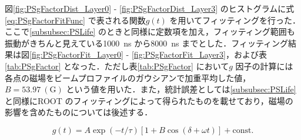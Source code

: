 図\ref{fig:PSgFactorDist_Layer0} - \ref{fig:PSgFactorDist_Layer3} のヒストグラムに式\eqref{eq:PSgFactorFitFunc} で表される関数$g(t)$ を用いてフィッティングを行った．ここで\ref{subsubsec:PSLife} のときと同様に定数項を加え，フィッティング範囲も振動がきちんと見えている1000~ns から8000~ns までとした．フィッティング結果は図\ref{fig:PSgFactorFit_Layer0} - \ref{fig:PSgFactorFit_Layer3}，および表\ref{tab:PSgFactor} となった．ただし表\ref{tab:PSgFactor} において$g$ 因子の計算には各点の磁場をビームプロファイルのガウシアンで加重平均した値，$B = 53.97~(\mathrm{G})$ という値を用いた．また，統計誤差としては\ref{subsubsec:PSLife} と同様にROOT のフィッティングによって得られたものを載せており，磁場の影響を含めたものについては後述する．

\begin{equation}
g(t) = A \exp(-t / \tau) [1 + B \cos(\delta + \omega t)] + \mathrm{const.}
\label{eq:PSgFactorFitFunc}
\end{equation}

